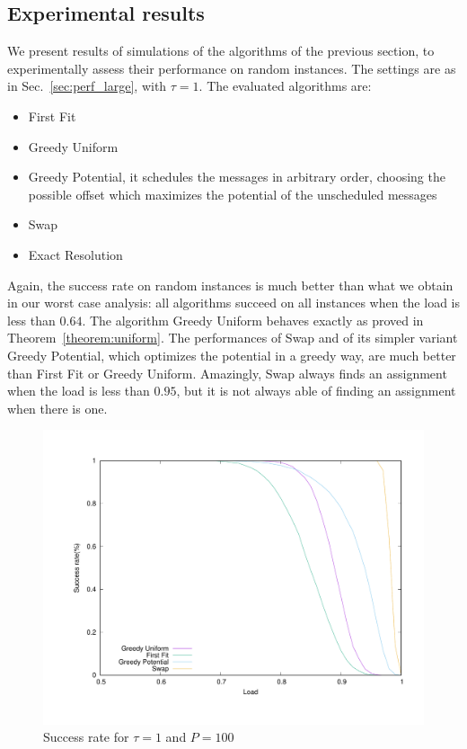 \documentclass[10pt, conference, letterpaper]{IEEEtran}
\begin{document}
\subsection{Experimental results} \label{sec:perf_small}


We present results of simulations of the algorithms of the previous section, to experimentally assess their performance on
random instances. The settings are as in Sec.~\ref{sec:perf_large}, with $\tau = 1$.
The evaluated algorithms are:

\begin{itemize}
	\item First Fit
	\item Greedy Uniform 
	\item Greedy Potential, it schedules the messages in arbitrary order, choosing the possible offset which 
	maximizes the potential of the unscheduled messages
	\item Swap 
	\item Exact Resolution
\end{itemize}

Again, the success rate on random instances is much better than what we obtain in our worst case 
analysis: all algorithms succeed on all instances when the load is less than $0.64$. The algorithm Greedy Uniform behaves exactly as proved in Theorem~\ref{theorem:uniform}. The performances of Swap and of its simpler variant Greedy Potential, which optimizes the potential in a greedy way, are much better than First Fit or Greedy Uniform. Amazingly, Swap always finds an assignment when the load is less than $0.95$, but it is not always able of finding an assignment when there is one.

\begin{figure}
\begin{center}
\includegraphics[scale=0.3]{success_tau1}
\end{center}
\caption{Success rate for $\tau = 1$ and $P=100$}
\label{fig:tau1}
\end{figure}
\end{document}
